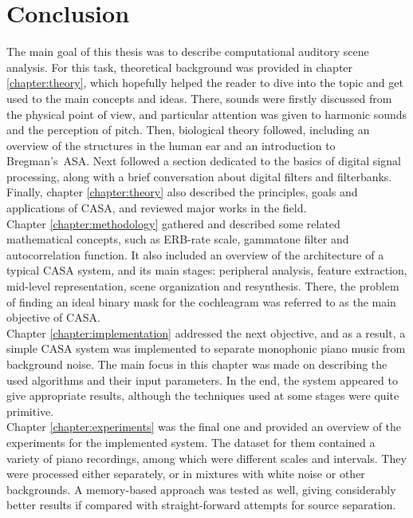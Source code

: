 \chapter{Conclusion}\label{chapter:conclusion}

The main goal of this thesis was to describe computational auditory scene analysis. For this task, theoretical background was provided in chapter \ref{chapter:theory}, which hopefully helped the reader to dive into the topic and get used to the main concepts and ideas. There, sounds were firstly discussed from the physical point of view, and particular attention was given to harmonic sounds and the perception of pitch. Then, biological theory followed, including an overview of the structures in the human ear and an introduction to Bregman's~ASA. Next followed a section dedicated to the basics of digital signal processing, along with a brief conversation about digital filters and filterbanks. Finally, chapter \ref{chapter:theory} also described the principles, goals and applications of CASA, and reviewed major works in the field.\\

Chapter \ref{chapter:methodology} gathered and described some related mathematical concepts, such as ERB-rate scale, gammatone filter and autocorrelation function. It also included an overview of the architecture of a typical CASA system, and its main stages: peripheral analysis, feature extraction, mid-level representation, scene organization and resynthesis. There, the problem of finding an ideal binary mask for the cochleagram was referred to as the main objective of CASA.\\

Chapter \ref{chapter:implementation} addressed the next objective, and as a result, a simple CASA system was implemented to separate monophonic piano music from background noise. The main focus in this chapter was made on describing the used algorithms and their input parameters. In the end, the system appeared to give appropriate results, although the techniques used at some stages were quite primitive.\\

Chapter \ref{chapter:experiments} was the final one and provided an overview of the experiments for the implemented system. The dataset for them contained a variety of piano recordings, among which were diffe\-rent scales and intervals. They were processed either separately, or in mixtures with white noise or other backgrounds. A memory-based approach was tested as well, giving considerably better results if compared with straight-forward attempts for source separation.\\

